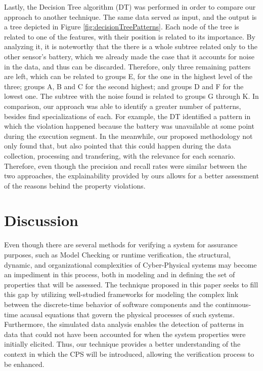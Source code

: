 Lastly, the Decision Tree algorithm (DT) was performed in order to compare our approach to another technique. The same data served as input, and the output is a tree depicted in Figure \ref{fig:decisionTreePatterns}. Each node of the tree is related to one of the features, with their position is related to its importance. By analyzing it, it is noteworthy that the there is a whole subtree related only to the other sensor's battery, which we already made the case that it accounts for noise in the data, and thus can be discarded. Therefore, only three remaining patters are left, which can be related to groups E, for the one in the highest level of the three; groups A, B and C for the second highest; and groups D and F for the lowest one. The subtree with the noise found is related to groups G through K. In comparison, our approach was able to identify a greater number of patterns, besides find specializations of each. For example, the DT identified a pattern in which the violation happened because the battery was unavailable at some point during the execution segment. In the meanwhile, our proposed methodology not only found that, but also pointed that this could happen during the data collection, processing and transfering, with the relevance for each scenario. Therefore, even though the precision and recall rates were similar between the two approaches, the explainability provided by ours allows for a better assessment of the reasons behind the property violations.


\section{Discussion}

Even though there are several methods for verifying a system for assurance purposes, such as Model Checking or runtime verification, the structural, dynamic, and organizational complexities of Cyber-Physical systems may become an impediment in this process, both in modeling and in defining the set of properties that will be assessed. The technique proposed in this paper seeks to fill this gap by utilizing well-studied frameworks for modeling the complex link between the discrete-time behavior of software components and the continuous-time acausal equations that govern the physical processes of such systems. Furthermore, the simulated data analysis enables the detection of patterns in data that could not have been accounted for when the system properties were initially elicited. Thus, our technique provides a better understanding of the context in which the CPS will be introduced, allowing the verification process to be enhanced.

